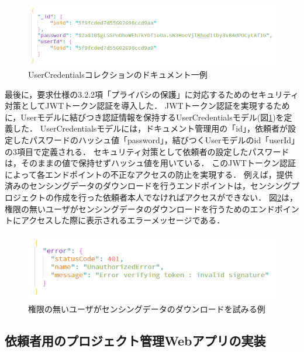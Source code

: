 \begin{figure}[H]
  \centering
  \includegraphics[width=150mm]{UserCredentials.png}
  \caption{UserCredentialsコレクションのドキュメント一例}
  \label{UserCredentials}
\end{figure}


最後に，要求仕様の3.2.2項「プライバシの保護」に対応するためのセキュリティ対策としてJWTトークン認証を導入した．
JWTトークン認証を実現するために，Userモデルに結びつき認証情報を保持するUserCredentialsモデル(図\ref{UserCredentials})を定義した．
UserCredentialsモデルには，ドキュメント管理用の「id」，依頼者が設定したパスワードのハッシュ値「password」，結びつくUserモデルのid「userId」の3項目で定義される．
セキュリティ対策として依頼者の設定したパスワードは，そのままの値で保持せずハッシュ値を用いている．
このJWTトークン認証によって各エンドポイントの不正なアクセスの防止を実現する．
例えば，提供済みのセンシングデータのダウンロードを行うエンドポイントは，センシングプロジェクトの作成を行った依頼者本人でなければアクセスができない．
図\ref{fig401}は，権限の無いユーザがセンシングデータのダウンロードを行うためのエンドポイントにアクセスした際に表示されるエラーメッセージである．



\begin{figure}[H]
  \centering
  \includegraphics[width=120mm]{401.png}
  \caption{権限の無いユーザがセンシングデータのダウンロードを試みる例}
  \label{fig401}
\end{figure}


\subsection{依頼者用のプロジェクト管理Webアプリの実装}

